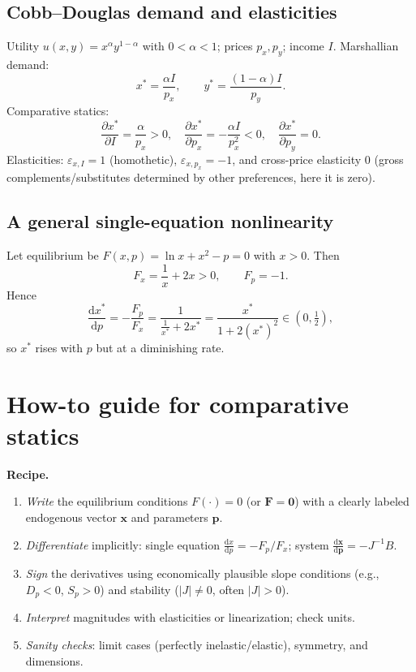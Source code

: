 \documentclass[11pt]{article}
\newcommand{\ve}[1]{\mathbf{#1}}
\newcommand{\pd}[2]{\frac{\partial #1}{\partial #2}}
\newcommand{\dtotal}[2]{\frac{\mathrm{d} #1}{\mathrm{d} #2}}
\begin{document}
\subsection{Cobb--Douglas demand and elasticities}
Utility \(u(x,y)=x^\alpha y^{1-\alpha}\) with \(0<\alpha<1\); prices \(p_x,p_y\); income \(I\).
Marshallian demand:
\[
x^\ast=\frac{\alpha I}{p_x},\qquad y^\ast=\frac{(1-\alpha)I}{p_y}.
\]
Comparative statics:
\[
\pd{x^\ast}{I}=\frac{\alpha}{p_x}>0,\quad \pd{x^\ast}{p_x}=-\frac{\alpha I}{p_x^2}<0,\quad
\pd{x^\ast}{p_y}=0.
\]
Elasticities: \(\varepsilon_{x,I}=1\) (homothetic), \(\varepsilon_{x,p_x}=-1\), and cross-price elasticity \(0\) (gross complements/substitutes determined by other preferences, here it is zero).

\subsection{A general single-equation nonlinearity}
Let equilibrium be \(F(x,p)=\ln x + x^2 - p=0\) with \(x>0\). Then
\[
F_x=\frac{1}{x}+2x>0,\qquad F_p=-1.
\]
Hence
\[
\dtotal{x^\ast}{p}=-\frac{F_p}{F_x}=\frac{1}{\frac{1}{x^\ast}+2x^\ast}=\frac{x^\ast}{1+2(x^\ast)^2}\in(0,\tfrac12),
\]
so \(x^\ast\) rises with \(p\) but at a diminishing rate.

\section{How-to guide for comparative statics}
\begin{tcolorbox}[sectionbox]
\textbf{Recipe.}
\begin{enumerate}[label=\arabic*.]
  \item \emph{Write} the equilibrium conditions \(F(\cdot)=0\) (or \(\ve F=\ve 0\)) with a clearly labeled endogenous vector \(\ve x\) and parameters \(\ve p\).
  \item \emph{Differentiate} implicitly: single equation \(\dtotal{x}{p}=-F_p/F_x\); system \(\dtotal{\ve x}{\ve p}=-J^{-1}B\).
  \item \emph{Sign} the derivatives using economically plausible slope conditions (e.g., \(D_p<0\), \(S_p>0\)) and stability (\(|J|\neq 0\), often \(|J|>0\)).
  \item \emph{Interpret} magnitudes with elasticities or linearization; check units.
  \item \emph{Sanity checks}: limit cases (perfectly inelastic/elastic), symmetry, and dimensions.
\end{enumerate}
\end{tcolorbox}
\end{document}
